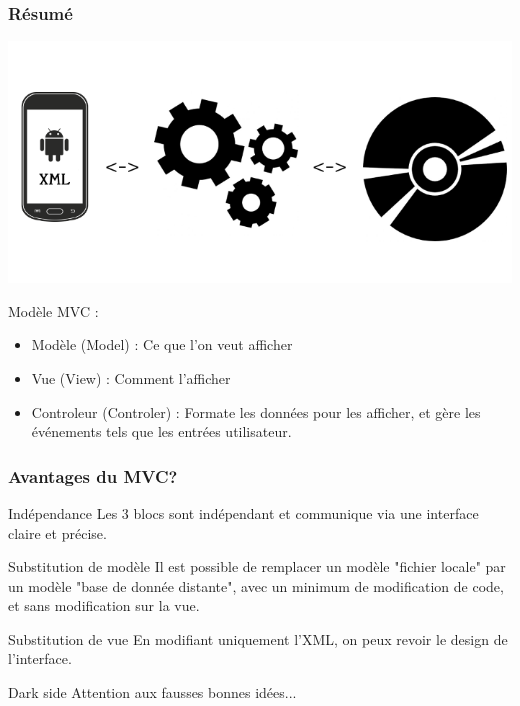 \documentclass{beamer}
\begin{document}
\begin{frame}
\frametitle{Résumé}
\begin{center}
\includegraphics[scale=0.35]{MVC.png}
\end{center}
\begin{block}{Modèle MVC :}
\begin{itemize}
\item Modèle (Model) : Ce que l'on veut afficher
\item Vue (View) : Comment l'afficher
\item Controleur (Controler) : Formate les données pour les afficher, et gère les événements tels que les entrées utilisateur.
\end{itemize}
\end{block}
\end{frame}


\begin{frame}
\frametitle{Avantages du MVC?}
\begin{block}{Indépendance}
Les 3 blocs sont indépendant et communique via une interface claire et précise.
\end{block}
\pause
\begin{block}{Substitution de modèle}
Il est possible de remplacer un modèle "fichier locale" par un modèle "base de donnée distante", avec un minimum de modification de code, et sans modification sur la vue.
\end{block}
\pause
\begin{block}{Substitution de vue}
En modifiant uniquement l'XML, on peux revoir le design de l'interface.
\end{block}
\pause
\begin{alertblock}{Dark side}
Attention aux fausses bonnes idées...
\end{alertblock}
\end{frame}
\end{document}
